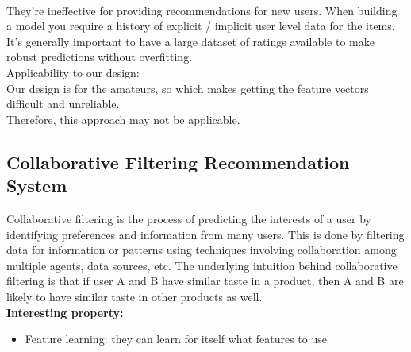 \\They’re ineffective for providing recommendations for new users. When building a model you require a history of explicit / implicit user level data for the items. It’s generally important to have a large dataset of ratings available to make robust predictions without overfitting.
\\Applicability to our design:
\\Our design is for the amateurs, so which makes getting the feature vectors difficult and unreliable. 
\\Therefore, this approach may not be applicable.


\subsection{Collaborative Filtering Recommendation System}
Collaborative filtering is the process of predicting the interests of a user by identifying preferences and information from many users. This is done by filtering data for information or patterns using techniques involving collaboration among multiple agents, data sources, etc. The underlying intuition behind collaborative filtering is that if user A and B have similar taste in a product, then A and B are likely to have similar taste in other products as well.
\\\textbf{Interesting property:}
\begin{itemize}
\item Feature learning: they can learn for itself what features to use
\end{itemize}

